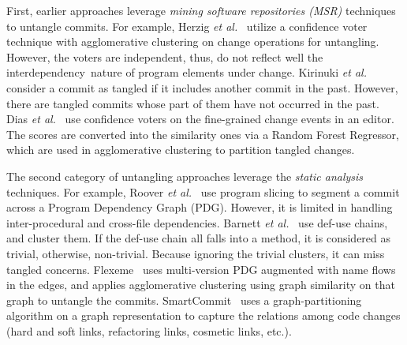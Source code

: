 First, earlier approaches leverage {\em mining software repositories
  (MSR)} techniques to untangle commits. For example, Herzig {\em et
  al.}~\cite{kim-msr13,kim-emse16} utilize a confidence voter
technique with agglomerative clustering on change
operations for untangling.
However, the voters are independent, thus, do not reflect well the
interdependency~nature of program elements under change.
%
Kirinuki {\em et al.}~\cite{higo-apsec16, higo-icpc14} consider a
commit as tangled if it includes another commit in the past. However,
there are tangled commits whose part of them have not occurred
in the past.
%
Dias {\em et al.}~\cite{dias-saner15} use confidence voters
on the fine-grained change events in an editor. The scores are converted
into the similarity ones via a Random Forest Regressor, which are used
in agglomerative clustering to partition tangled changes.

The second category of untangling approaches leverage the {\em static
  analysis} techniques. For example, Roover {\em et al.}~\cite{roover-scam18} use
program slicing to segment a commit across a Program Dependency Graph
(PDG).  However, it is limited in handling inter-procedural and
cross-file dependencies. Barnett {\em et al.}~\cite{barnett-icse15}
use def-use chains, and cluster them. If the def-use chain all falls
into a method, it is considered as trivial, otherwise,
non-trivial. Because ignoring the trivial clusters, it can miss tangled
concerns. Flexeme~\cite{flexeme-fse20} uses multi-version PDG
augmented with name flows in the edges, and applies agglomerative
clustering using graph similarity on that graph to untangle the
commits. SmartCommit~\cite{smartcommit-fse21} uses a
graph-partitioning algorithm on a graph representation to capture the
relations among code changes (hard and soft links, refactoring links,
cosmetic links, etc.).


